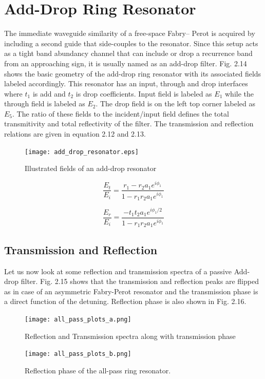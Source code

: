 \section{Add-Drop Ring Resonator}
The immediate waveguide similarity of a free-space Fabry– Perot is acquired by including a second guide that side-couples to the resonator.
Since this setup acts as a tight band abundancy channel that can include or drop a recurrence band from an approaching sign, it is usually named as an add-drop filter. Fig. 2.14 shows the basic geometry of the add-drop ring resonator with its associated fields labeled accordingly. This resonator has an input, through and drop interfaces where $t_{1}$ is add and $t_{2}$ is drop coefficients. Input field is labeled as $E_{1}$ while the through field is labeled as $E_{2}$. The drop field is on the left top corner labeled as $E_{5}$. The ratio of these fields to the incident/input field defines the total transmitivity and total reflectivity of the filter. The transmission and reflection relations are given in equation 2.12 and 2.13.
\begin{figure}[h]
\centering
\texttt{[image: add\_drop\_resonator.eps]}
\caption{Illustrated fields of an add-drop resonator}
\end{figure}


\begin{equation}
\frac{E_{t}}{E_{i}} = \frac{r_{1} - r_{2} a_{1} e^{i\phi_{1}}}{1 - r_{1} r_{2} a_{1} e^{i\phi_{1}}}
\end{equation}

\begin{equation}
\frac{E_{r}}{E_{i}} = \frac{- t_{1} t_{2} a_{1} e^{i \phi_{1}/2}}{1 - r_{1} r_{2} a_{1} e^{i\phi_{1}}}
\end{equation}



\subsection{Transmission and Reflection}
Let us now look at some reflection and transmission spectra of a passive Add- drop filter. Fig. 2.15 shows that the transmission and reflection peaks are flipped as in case of an asymmetric Fabry-Perot resonator and the transmission phase is a direct function of the detuning. Reflection phase is also shown in Fig. 2.16.

\begin{figure}[h]
\centering
\texttt{[image: all\_pass\_plots\_a.png]}
\caption{Reflection and Transmission spectra along with transmission phase} 
\end{figure}
\newpage
\begin{figure}[t]
\centering
\texttt{[image: all\_pass\_plots\_b.png]}
\caption{Reflection phase of the all-pass ring resonator.}
\end{figure}


